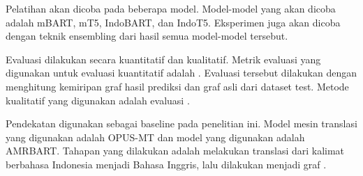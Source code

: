 
Pelatihan \amrparsing{} akan dicoba pada beberapa \multil{} model.
Model-model yang akan dicoba adalah mBART, mT5, IndoBART, dan IndoT5.
Eksperimen \amrparsing{} juga akan dicoba dengan teknik \AMR{} ensembling  dari hasil semua model-model tersebut.

Evaluasi dilakukan secara kuantitatif dan kualitatif.
Metrik evaluasi yang digunakan untuk evaluasi kuantitatif adalah \SMATCH{}.
Evaluasi tersebut dilakukan dengan menghitung kemiripan graf \AMR{} hasil prediksi dan graf \AMR{} asli dari dataset test.
Metode kualitatif yang digunakan adalah evaluasi \transdiver{}.

Pendekatan   digunakan sebagai baseline pada penelitian ini.
Model mesin translasi yang digunakan adalah {OPUS-MT} dan model \amrparsing{} yang digunakan adalah \gls{AMRBART}.
Tahapan yang dilakukan adalah melakukan translasi dari kalimat berbahasa Indonesia menjadi Bahasa Inggris, lalu dilakukan \amrparsing{} menjadi graf \AMR{}.
